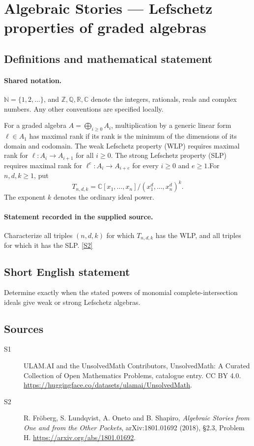 \documentclass[11pt]{article}
\newcommand{\sref}[2]{\hyperlink{source:#1:#2}{[S#2]}}
\begin{document}
\section{Algebraic Stories — Lefschetz properties of graded algebras}\label{statement}

\subsection{Definitions and mathematical statement}

\paragraph{Shared notation.}$\mathbb N=\{1,2,\ldots\}$, and $\mathbb Z,\mathbb Q,\mathbb R,\mathbb C$ denote the integers, rationals, reals and complex numbers. Any other conventions are specified locally.


For a graded algebra $A=\bigoplus_{i\geq0}A_i$, multiplication by a generic linear form $\ell\in A_1$ has maximal rank if its rank is the minimum of the dimensions of its domain and codomain. The weak Lefschetz property (WLP) requires maximal rank for $\ell:A_i\to A_{i+1}$ for all $i\geq0$. The strong Lefschetz property (SLP) requires maximal rank for $\ell^e:A_i\to A_{i+e}$ for every $i\geq0$ and $e\geq1$.For $n,d,k\geq1$, put
\[T_{n,d,k}=\mathbb C[x_1,\ldots,x_n]/(x_1^d,\ldots,x_n^d)^k.
\]
The exponent $k$ denotes the ordinary ideal power.
\paragraph{Statement recorded in the supplied source.}
Characterize all triples $(n,d,k)$ for which $T_{n,d,k}$ has the WLP, and all triples for which it has the SLP. \sref{statement}{2}
\subsection{Short English statement}
Determine exactly when the stated powers of monomial complete-intersection ideals give weak or strong Lefschetz algebras.
\subsection{Sources}
\begin{description}
\item[\hypertarget{source:statement:1}{S1}] ULAM.AI and the UnsolvedMath Contributors, UnsolvedMath: A Curated Collection of Open Mathematics Problems, catalogue entry. CC BY 4.0. \url{https://huggingface.co/datasets/ulamai/UnsolvedMath}.
\item[\hypertarget{source:statement:2}{S2}] R. Fröberg, S. Lundqvist, A. Oneto and B. Shapiro, \emph{Algebraic Stories from One and from the Other Pockets}, arXiv:1801.01692 (2018), §2.3, Problem H. \url{https://arxiv.org/abs/1801.01692}.
\end{description}
\label{end:statement}
\end{document}

